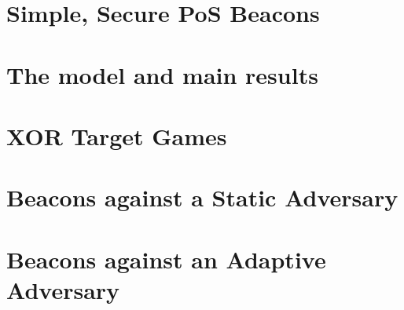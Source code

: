 \chapter{Simple, Secure PoS Beacons}\label{sec:xorgames-intro}


\chapter{The model and main results}
\label{sec:xorgames-model}

\chapter{XOR Target Games}\label{sec:xor-games}


\chapter{Beacons against a Static Adversary}\label{app:bernoulli}


% 

\chapter{Beacons against an Adaptive Adversary}\label{sec:composing-xor-games}\label{sec:beacon}





